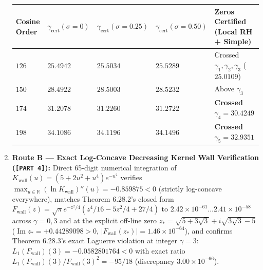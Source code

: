 \documentclass[
  11pt,
]{article}
\newcounter{none} %
\begin{document}
\begin{enumerate}
  {\def\LTcaptype{none} %
  \begin{longtable}[]{@{}
    >{\centering\arraybackslash}p{}
    >{\centering\arraybackslash}p{}
    >{\centering\arraybackslash}p{}
    >{\centering\arraybackslash}p{}
    >{\raggedright\arraybackslash}p{}@{}}
  \toprule\noalign{}
  \begin{minipage}[b]{\linewidth}\centering
  Cosine Order
  \end{minipage} & \begin{minipage}[b]{\linewidth}\centering
  \(\gamma_{\text{cert}}(\sigma = 0)\)
  \end{minipage} & \begin{minipage}[b]{\linewidth}\centering
  \(\gamma_{\text{cert}}(\sigma = 0.25)\)
  \end{minipage} & \begin{minipage}[b]{\linewidth}\centering
  \(\gamma_{\text{cert}}(\sigma = 0.50)\)
  \end{minipage} & \begin{minipage}[b]{\linewidth}\raggedright
  Zeros Certified (Local RH + Simple)
  \end{minipage} \\
  \midrule\noalign{}
  \endhead
  \bottomrule\noalign{}
  \endlastfoot
  \(126\) & \(25.4942\) & \(25.5034\) & \(25.5289\) & Crossed
  \(\gamma_1, \gamma_2, \gamma_3\) (\(25.0109\)) \\
  \(150\) & \(28.4922\) & \(28.5003\) & \(28.5232\) & Above
  \(\gamma_3\) \\
  \textbf{\(174\)} & \textbf{\(31.2078\)} & \textbf{\(31.2260\)} &
  \textbf{\(31.2722\)} & \textbf{Crossed \(\gamma_4 = 30.4249\)} \\
  \textbf{\(198\)} & \textbf{\(34.1086\)} & \textbf{\(34.1196\)} &
  \textbf{\(34.1496\)} & \textbf{Crossed \(\gamma_5 = 32.9351\)} \\
  \end{longtable}
  }
\item
  \textbf{Route B --- Exact Log-Concave Decreasing Kernel Wall
  Verification (\texttt{{[}PART\ 4{]}}):} Direct 65-digit numerical
  integration of \(K_{\text{wall}}(u) = (5 + 2u^2 + u^4)e^{-u^2}\)
  verifies
  \(\max_{u \in \mathbb{R}}(\ln K_{\text{wall}})''(u) = -0.859875 < 0\)
  (strictly log-concave everywhere), matches Theorem 6.28.2's closed
  form
  \(F_{\text{wall}}(z) = \sqrt{\pi}e^{-z^2/4}(z^4/16 - 5z^2/4 + 27/4)\)
  to \(2.42 \times 10^{-61} \dots 2.41 \times 10^{-58}\) across
  \(\gamma = 0, 3\) and at the explicit off-line zero
  \(z_* = \sqrt{5+3\sqrt{3}} + i\sqrt{3\sqrt{3}-5}\)
  (\(\operatorname{Im} z_* = +0.44289098 > 0\),
  \(|F_{\text{wall}}(z_*)| = 1.46 \times 10^{-64}\)), and confirms
  Theorem 6.28.3's exact Laguerre violation at integer \(\gamma = 3\):
  \(L_1(F_{\text{wall}})(3) = -0.0582801764 < 0\) with exact ratio
  \(L_1(F_{\text{wall}})(3)/F_{\text{wall}}(3)^2 = -95/18\) (discrepancy
  \(3.00 \times 10^{-66}\)).
\end{enumerate}
\end{document}
